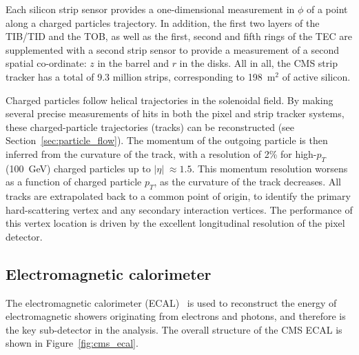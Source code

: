 Each silicon strip sensor provides a one-dimensional measurement in $\phi$ of a point along a charged particles trajectory. In addition, the first two layers of the TIB/TID and the TOB, as well as the first, second and fifth rings of the TEC are supplemented with a second strip sensor to provide a measurement of a second spatial co-ordinate: $z$ in the barrel and $r$ in the disks. All in all, the CMS strip tracker has a total of 9.3 million strips, corresponding to 198~m$^2$ of active silicon.

Charged particles follow helical trajectories in the solenoidal field. By making several precise measurements of hits in both the pixel and strip tracker systems, these charged-particle trajectories (tracks) can be reconstructed (see Section~\ref{sec:particle_flow}). 
The momentum of the outgoing particle is then inferred from the curvature of the track, with a resolution of 2\% for high-$p_T$ (100~GeV) charged particles up to $|\eta|\;\approx1.5$. This momentum resolution worsens as a function of charged particle $p_T$, as the curvature of the track decreases. All tracks are extrapolated back to a common point of origin, to identify the primary hard-scattering vertex and any secondary interaction vertices. The performance of this vertex location is driven by the excellent longitudinal resolution of the pixel detector.

\subsection{Electromagnetic calorimeter}\label{sec:cms_ecal}
The electromagnetic calorimeter (ECAL)~\cite{Chatrchyan:2008zzk,Benaglia:1632384,CMS:1997ysd} is used to reconstruct the energy of electromagnetic showers originating from electrons and photons, and therefore is the key sub-detector in the \Hgg analysis. The overall structure of the CMS ECAL is shown in Figure~\ref{fig:cms_ecal}. 

